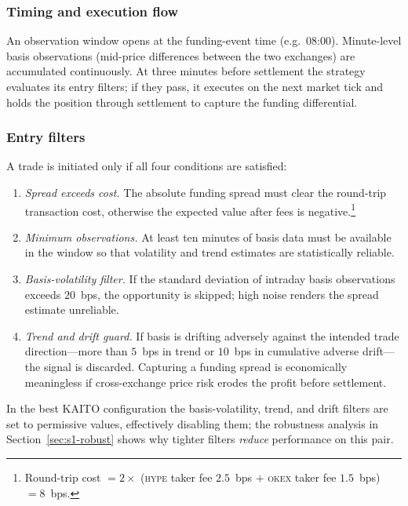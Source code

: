 \documentclass[10pt,twocolumn,a4paper]{article}
\begin{document}
\subsubsection{Timing and execution flow}

An observation window opens at the funding-event time (e.g.\ 08:00).
Minute-level basis observations (mid-price differences between the two
exchanges) are accumulated continuously.  At three minutes before
settlement the strategy evaluates its entry filters; if they pass, it
executes on the next market tick and holds the position through settlement
to capture the funding differential.

\subsubsection{Entry filters}

A trade is initiated only if all four conditions are satisfied:
\begin{enumerate}
  \item \emph{Spread exceeds cost.}  The absolute funding spread must
        clear the round-trip transaction cost, otherwise the expected
        value after fees is negative.\footnote{Round-trip cost
        $= 2\times$ (\textsc{hype} taker fee $2.5$~bps $+$ \textsc{okex}
        taker fee $1.5$~bps) $= 8$~bps.}
  \item \emph{Minimum observations.}  At least ten minutes of basis data
        must be available in the window so that volatility and trend
        estimates are statistically reliable.
  \item \emph{Basis-volatility filter.}  If the standard deviation of
        intraday basis observations exceeds $20$~bps, the opportunity is
        skipped; high noise renders the spread estimate unreliable.
  \item \emph{Trend and drift guard.}  If basis is drifting adversely
        against the intended trade direction---more than $5$~bps in trend
        or $10$~bps in cumulative adverse drift---the signal is discarded.
        Capturing a funding spread is economically meaningless if
        cross-exchange price risk erodes the profit before settlement.
\end{enumerate}

In the best KAITO configuration the basis-volatility, trend, and drift
filters are set to permissive values, effectively disabling them; the
robustness analysis in Section~\ref{sec:s1-robust} shows why tighter
filters \emph{reduce} performance on this pair.
\end{document}
